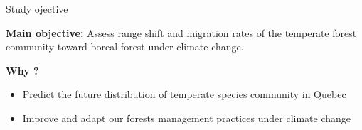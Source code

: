 \documentclass[10pt,aspectratio=149]{beamer}
\begin{document}




\begin{frame}{Study ojective}

\textbf{Main objective:} Assess range shift and migration rates of the temperate forest community toward boreal forest under climate change.

\pause 

\vspace{1em}
\textbf{Why ?}
		\begin{itemize}
			\item Predict the future distribution of temperate species community in Quebec
		 	\item Improve and adapt our forests management practices under climate change
		\end{itemize}

\end{frame}

\end{document}
